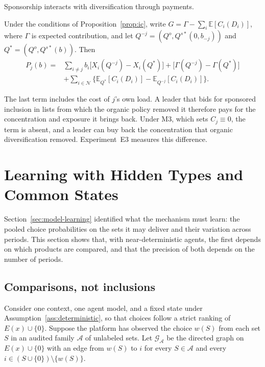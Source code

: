 \documentclass[opre,dblanonrev]{informs4}
\providecommand{\E}{\mathbb{E}}
\providecommand{\1}{\mathbf{1}}
\begin{document}
Sponsorship interacts with diversification through payments.

\begin{corollary}\label{cor:congestion}
Under the conditions of Proposition~\ref{prop:ic}, write $G=\Gamma-\sum_i\E[C_i(D_i)]$, where $\Gamma$ is expected contribution, and let $Q^{-j}=(Q^o,Q^{s\ast}(0,b_{-j}))$ and $Q^\ast=(Q^o,Q^{s\ast}(b))$. Then
\[
\begin{aligned}
P_j(b)={}&\sum_{i\ne j}b_i\bigl[X_i(Q^{-j})-X_i(Q^\ast)\bigr]+\bigl[\Gamma(Q^{-j})-\Gamma(Q^\ast)\bigr]\\
&+\sum_{i\in\mathcal N}\bigl\{\E_{Q^\ast}[C_i(D_i)]-\E_{Q^{-j}}[C_i(D_i)]\bigr\}.
\end{aligned}
\]
\end{corollary}

The last term includes the cost of $j$'s own load. A leader that bids for sponsored inclusion in lists from which the organic policy removed it therefore pays for the concentration and exposure it brings back. Under M3, which sets $C_j\equiv0$, the term is absent, and a leader can buy back the concentration that organic diversification removed. Experiment~E3 measures this difference.

\section{Learning with Hidden Types and Common States}\label{sec:learning}

Section~\ref{sec:model-learning} identified what the mechanism must learn: the pooled choice probabilities on the sets it may deliver and their variation across periods. This section shows that, with near-deterministic agents, the first depends on which products are compared, and that the precision of both depends on the number of periods.

\subsection{Comparisons, not inclusions}\label{sec:learning-identify}

Consider one context, one agent model, and a fixed state under Assumption~\ref{ass:deterministic}, so that choices follow a strict ranking of $E(x)\cup\{0\}$. Suppose the platform has observed the choice $w(S)$ from each set $S$ in an audited family $\mathcal A$ of unlabeled sets. Let $\mathcal G_{\mathcal A}$ be the directed graph on $E(x)\cup\{0\}$ with an edge from $w(S)$ to $i$ for every $S\in\mathcal A$ and every $i\in(S\cup\{0\})\setminus\{w(S)\}$.
\end{document}
